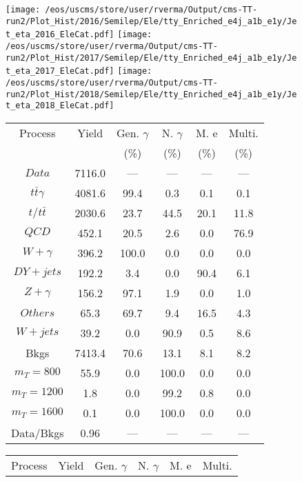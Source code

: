 \begin{figure}
\centering
\texttt{[image: /eos/uscms/store/user/rverma/Output/cms-TT-run2/Plot\_Hist/2016/Semilep/Ele/tty\_Enriched\_e4j\_a1b\_e1y/Jet\_eta\_2016\_EleCat.pdf]}
\texttt{[image: /eos/uscms/store/user/rverma/Output/cms-TT-run2/Plot\_Hist/2017/Semilep/Ele/tty\_Enriched\_e4j\_a1b\_e1y/Jet\_eta\_2017\_EleCat.pdf]}
\texttt{[image: /eos/uscms/store/user/rverma/Output/cms-TT-run2/Plot\_Hist/2018/Semilep/Ele/tty\_Enriched\_e4j\_a1b\_e1y/Jet\_eta\_2018\_EleCat.pdf]}
\begin{minipage}[c]{0.32\textwidth}
\centering
\tiny{
\begin{tabular}{cccccc}
\hline
Process & Yield & Gen. $\gamma$ & N. $\gamma$ & M. e & Multi. \\
 &  & (\%) & (\%) & (\%) & (\%)  \\
\hline
                                                                      $ Data $ &  7116.0 &  --- &  --- &  --- &  ---\\
$ t\bar{t}\gamma $ &  4081.6 &  99.4 &  0.3 &  0.1 &  0.1\\
$ t/t\bar{t} $ &  2030.6 &  23.7 &  44.5 &  20.1 &  11.8\\
$ QCD $ &  452.1 &  20.5 &  2.6 &  0.0 &  76.9\\
$ W+\gamma $ &  396.2 &  100.0 &  0.0 &  0.0 &  0.0\\
$ DY+jets $ &  192.2 &  3.4 &  0.0 &  90.4 &  6.1\\
$ Z+\gamma $ &  156.2 &  97.1 &  1.9 &  0.0 &  1.0\\
$ Others $ &  65.3 &  69.7 &  9.4 &  16.5 &  4.3\\
$ W+jets $ &  39.2 &  0.0 &  90.9 &  0.5 &  8.6\\
Bkgs &  7413.4 &  70.6 &  13.1 &  8.1 &  8.2\\
$ m_{T} = 800 $ &  55.9 &  0.0 &  100.0 &  0.0 &  0.0\\
$ m_{T} = 1200 $ &  1.8 &  0.0 &  99.2 &  0.8 &  0.0\\
$ m_{T} = 1600 $ &  0.1 &  0.0 &  100.0 &  0.0 &  0.0\\
Data/Bkgs &  0.96 &  --- &  --- &  --- &  ---\\
\hline
\end{tabular}
}
\end{minipage}
\begin{minipage}[c]{0.32\textwidth}
\centering
\tiny{
\begin{tabular}{cccccc}
\hline
Process & Yield & Gen. $\gamma$ & N. $\gamma$ & M. e & Multi. \\

\end{tabular}}
\end{minipage}
\end{figure}
